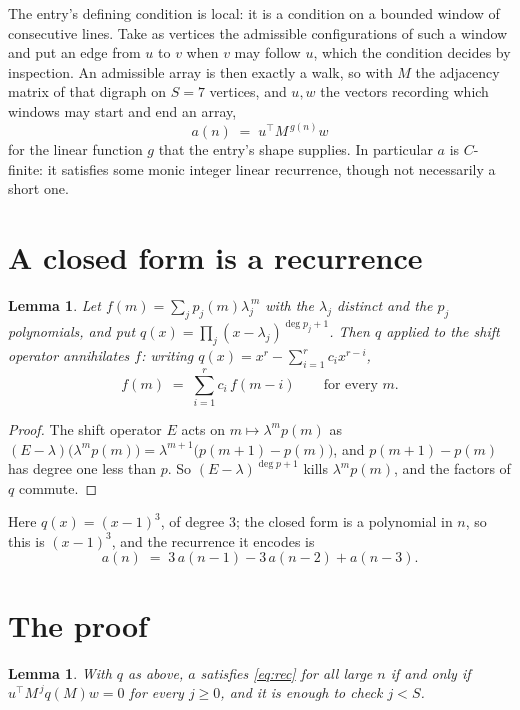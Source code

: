 \documentclass[11pt,a4paper]{article}
\theoremstyle{plain}
\newtheorem{lemma}[theorem]{Lemma}
\theoremstyle{definition}
\begin{document}
The entry's defining condition is local: it is a condition on a bounded window of consecutive lines. Take as vertices the
admissible configurations of such a window and put an edge from $u$ to $v$ when $v$ may
follow $u$, which the condition decides by inspection. An admissible array is then exactly a
walk, so with $M$ the adjacency matrix of that digraph on $S=7$ vertices, and $u,w$ the
vectors recording which windows may start and end an array,
\[
a(n)\;=\;u^{\!\top}M^{\,g(n)}w
\]
for the linear function $g$ that the entry's shape supplies. In particular $a$ is
$C$-finite: it satisfies some monic integer linear recurrence, though not necessarily a short
one.

\section{A closed form is a recurrence}

\begin{lemma}\label{lem:ann}
Let $f(m)=\sum_{j}p_j(m)\lambda_j^{\,m}$ with the $\lambda_j$ distinct and the $p_j$
polynomials, and put $q(x)=\prod_j(x-\lambda_j)^{\deg p_j+1}$. Then $q$ applied to the shift
operator annihilates $f$: writing $q(x)=x^{r}-\sum_{i=1}^{r}c_ix^{r-i}$,
\[
f(m)\;=\;\sum_{i=1}^{r}c_i\,f(m-i)\qquad\text{for every }m.
\]
\end{lemma}

\begin{proof}
The shift operator $E$ acts on $m\mapsto\lambda^{m}p(m)$ as
$(E-\lambda)\bigl(\lambda^{m}p(m)\bigr)=\lambda^{m+1}\bigl(p(m+1)-p(m)\bigr)$, and
$p(m+1)-p(m)$ has degree one less than $p$. So $(E-\lambda)^{\deg p+1}$ kills
$\lambda^{m}p(m)$, and the factors of $q$ commute.
\end{proof}

Here $q(x)=(x-1)^{3}$, of degree $3$; the closed form is a polynomial in $n$, so this is $(x-1)^{3}$, and the recurrence it encodes is
\begin{equation}\label{eq:rec}
a(n)\;=\;3\,a(n-1) - 3\,a(n-2) + a(n-3).
\end{equation}

\section{The proof}

\begin{lemma}\label{lem:crit}
With $q$ as above, $a$ satisfies \eqref{eq:rec} for all large $n$ if and only if
$u^{\!\top}M^{\,j}q(M)w=0$ for every $j\ge0$, and it is enough to check $j<S$.
\end{lemma}
\end{document}

